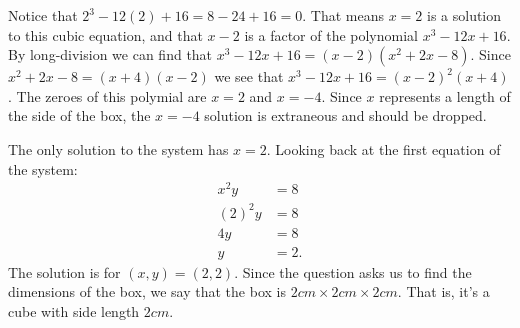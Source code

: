 \documentclass[nooutcomes]{ximera}
\begin{document}
\begin{exercise}
\begin{explanation}
			Notice that $2^3-12(2)+16 = 8 -24+16 = 0$. That means $x=2$ is a solution to this cubic equation, and that $x-2$ is a factor of the 
			polynomial $x^3-12x+16$. By long-division we can find that $x^3-12x+16 = (x-2)(x^2+2x-8)$. Since $x^2+2x-8 = (x+4)(x-2)$ we see
			that $x^3-12x+16 = (x-2)^2(x+4)$. The zeroes of this polymial are $x=2$ and $x=-4$. Since $x$ represents a length of the side of the box, 
			the $x=-4$ solution is extraneous and should be dropped.
			
			The only solution to the system has $x=2$. Looking back at the first equation of the system:
			\begin{align*}
				x^2 y &= 8\\
				(2)^2y &= 8\\
				4y &=8\\
				y &= 2.
			\end{align*}
			The solution is for $(x,y) = (2,2)$. Since the question asks us to find the dimensions of the box, we say that the box is 
			$2 cm \times 2 cm \times 2 cm$. That is, it's a cube with side length $2 cm$.
	
		\end{explanation}
	\end{exercise}	


	
\end{document}
